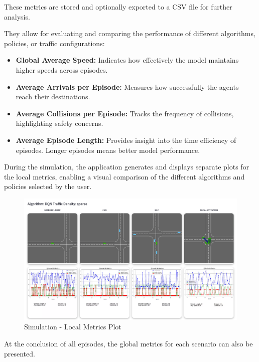 These metrics are stored and optionally exported to a CSV file for further analysis. 

They allow for evaluating and comparing the performance of different algorithms, policies, or traffic configurations:
\begin{itemize}
    \item \textbf{Global Average Speed:} Indicates how effectively the model maintains higher speeds across episodes.
    \item \textbf{Average Arrivals per Episode:} Measures how successfully the agents reach their destinations.
    \item \textbf{Average Collisions per Episode:} Tracks the frequency of collisions, highlighting safety concerns.
    \item \textbf{Average Episode Length:} Provides insight into the time efficiency of episodes. Longer episodes means better model performance.
\end{itemize}

During the simulation, the application generates and displays separate plots for the local metrics, enabling a visual comparison of the different algorithms and policies selected by the user. 


\begin{figure}[H]
    \centering
    \includegraphics[height=0.4\textheight]{images/app_plots.png} 
    \caption{Simulation - Local Metrics Plot}
\end{figure}

At the conclusion of all episodes, the global metrics for each scenario can also be presented.

